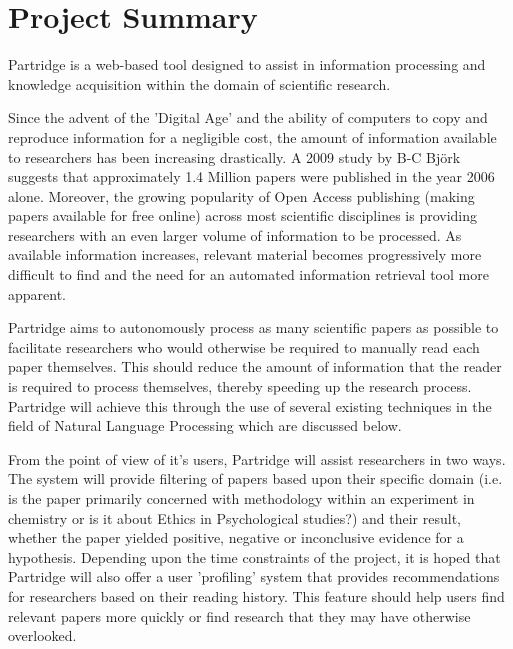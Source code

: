 \documentclass[12pt,a4paper]{article}
\begin{document}




\setlength{\parindent}{0pt}
\setlength{\parskip}{1.5ex plus 0.5ex minus 0.2ex}

\tableofcontents

\pagebreak

\section{Project Summary}

Partridge is a web-based tool designed to assist in information processing and knowledge
acquisition within the domain of scientific research.

Since the advent of the 'Digital Age' and the ability of computers to copy and
reproduce information for a negligible cost, the amount of information
available to researchers has been increasing drastically.  A 2009 study by B-C
Bj\"{o}rk suggests that approximately 1.4 Million papers were published in the
year 2006 alone\cite{bjork2009}. Moreover, the growing popularity of Open Access
publishing (making papers available for free online\cite{Suber2012}) across
most scientific disciplines\cite{bjork2009}\cite{harnad2004comparing} is
providing researchers with an even larger volume of information to be
processed. As available information increases, relevant material becomes
progressively more difficult to find and the need for an automated information
retrieval tool more apparent.

Partridge aims to autonomously process as many scientific papers as possible to
facilitate researchers who would otherwise be required to manually read each
paper themselves. This should reduce the amount of information that the reader
is required to process themselves, thereby speeding up the research process.
Partridge will achieve this through the use of several existing techniques in
the field of Natural Language Processing which are discussed below.

From the point of view of it's users, Partridge will assist researchers in two
ways. The system will provide filtering of papers based upon their
specific domain (i.e. is the paper primarily concerned with methodology within
an experiment in chemistry or is it about Ethics in Psychological studies?) and
their result, whether the paper yielded positive, negative or inconclusive
evidence for a hypothesis. Depending upon the time constraints of the
project, it is hoped that Partridge will also offer a user 'profiling' system
that provides recommendations for researchers based on their reading history.
This feature should help users find relevant papers more quickly or find
research that they may have otherwise overlooked.
\end{document}
